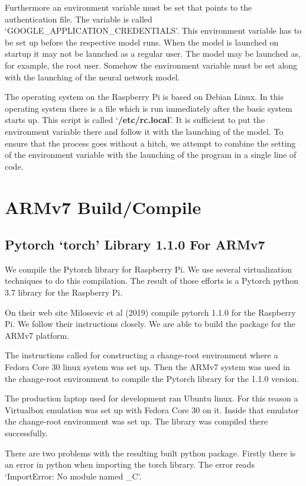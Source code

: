 Furthermore an environment variable must be set that points to the authentication file. The variable is called `GOOGLE\_APPLICATION\_CREDENTIALS'. This environment variable has to be set up before the respective model runs. When the model is launched on startup it may not be launched as a regular user. The model may be launched as, for example, the root user. Somehow the environment variable must be set along with the launching of the neural network model.

The operating system on the Raspberry Pi is based on Debian Linux. In this operating system there is a file which is run immediately after the basic system starts up. This script is called `\textbf{/etc/rc.local}'. It is sufficient to put the environment variable there and follow it with the launching of the model. To ensure that the process goes without a hitch, we attempt to combine the setting of the environment variable with the launching of the program in a single line of code.

\section{ARMv7 Build/Compile}

\subsection*{Pytorch `torch' Library 1.1.0 For ARMv7}
We compile the Pytorch library for Raspberry Pi. We use several virtualization techniques to do this compilation. The result of those efforts is a Pytorch python 3.7 library for the Raspberry Pi.

On their web site Milosevic et al (2019)\cite{2018Milosevic} compile pytorch 1.1.0 for the Raspberry Pi. We follow their instructions closely. We are able to build the package for the ARMv7 platform.

The instructions called for constructing a change-root environment where a Fedora Core 30 linux system was set up. Then the ARMv7 system was used in the change-root environment to compile the Pytorch library for the 1.1.0 version.

The production laptop used for development ran Ubuntu linux. For this reason a Virtualbox emulation was set up with Fedora Core 30 on it. Inside that emulator the change-root environment was set up. The library was compiled there successfully. 

There are two problems with the resulting built python package. Firstly there is an error in python when importing the torch library. The error reads `ImportError: No module named \_C'. 

